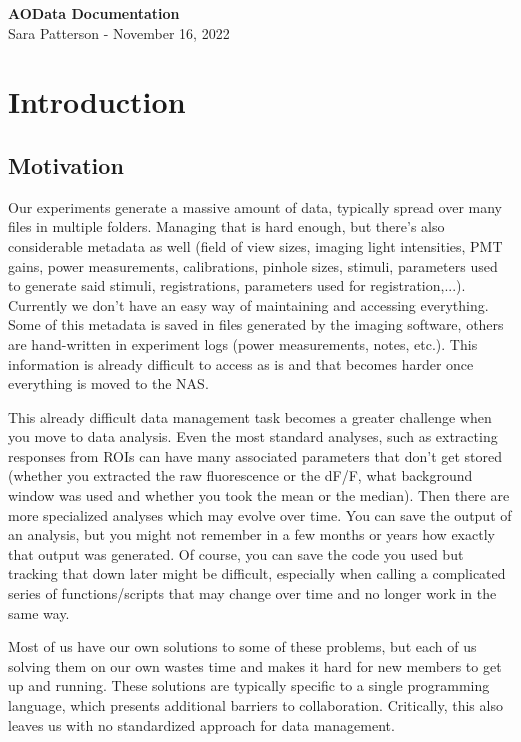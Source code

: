 \documentclass[10pt]{exam}
\begin{document}
	\noindent 
	\begin{center}
		{\LARGE\textbf{AOData Documentation}}
		\\\vspace{1.5ex}
		{\large Sara Patterson - November 16, 2022}
	\end{center}
	
	\tableofcontents
	\pagebreak 

\section{Introduction}
	\subsection{Motivation}
		\noindent Our experiments generate a massive amount of data, typically spread over many files in multiple folders. Managing that is hard enough, but there's also considerable metadata as well (field of view sizes, imaging light intensities, PMT gains, power measurements, calibrations, pinhole sizes, stimuli, parameters used to generate said stimuli, registrations, parameters used for registration,...). Currently we don't have an easy way of maintaining and accessing everything. Some of this metadata is saved in files generated by the imaging software, others are hand-written in experiment logs (power measurements, notes, etc.). This information is already difficult to access as is and that becomes harder once everything is moved to the NAS. 
		
		This already difficult data management task becomes a greater challenge when you move to data analysis. Even the most standard analyses, such as extracting responses from ROIs can have many associated parameters that don't get stored (whether you extracted the raw fluorescence or the dF/F, what background window was used and whether you took the mean or the median). Then there are more specialized analyses which may evolve over time. You can save the output of an analysis, but you might not remember in a few months or years how exactly that output was generated. Of course, you can save the code you used but tracking that down later might be difficult, especially when calling a complicated series of functions/scripts that may change over time and no longer work in the same way.
		
		Most of us have our own solutions to some of these problems, but each of us solving them on our own wastes time and makes it hard for new members to get up and running. These solutions are typically specific to a single programming language, which presents additional barriers to collaboration. Critically, this also leaves us with no standardized approach for data management. 
		
\end{document}
